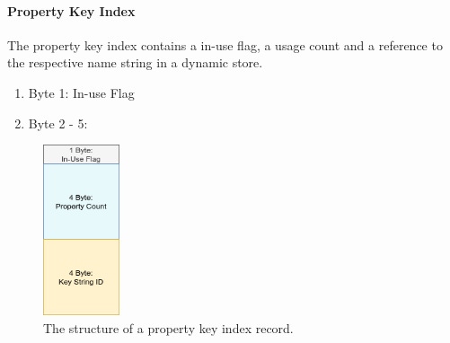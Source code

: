 \documentclass[a4paper,10pt]{article}
\begin{document}
          \paragraph{Property Key Index}
            The property key index contains a in-use flag, a usage count and a reference to the respective name string in a dynamic store.
            \begin{enumerate}
            \item Byte 1: In-use Flag
            \item Byte 2 - 5: 
            \end{enumerate}
                \begin{figure}[htp]\label{prop_key_idx}
                \begin{center}
                    \includegraphics[keepaspectratio,height=0.2\textheight,width=0.2\textwidth]{img/03_record/property/property_key_index.png}
                \end{center}
                \caption{The structure of a property key index record.} %
            \end{figure}

            
\end{document}
